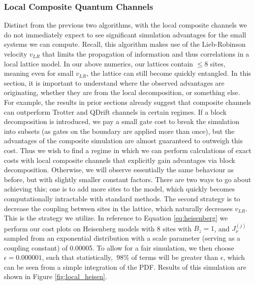 \subsubsection{Local Composite Quantum Channels}
Distinct from the previous two algorithms, with the local composite channels we do not immediately expect to see significant simulation advantages for the small systems we can compute. Recall, this algorithm makes use of the Lieb-Robinson velocity $v_{LR}$ that limits the propagation of information and thus correlations in a local lattice model. In our above numerics, our lattices contain $\leq 8$ sites, meaning even for small $v_{LR}$, the lattice can still become quickly entangled. In this section, it is important to understand where the observed advantages are originating, whether they are from the local decomposition, or something else. For example, the results in prior sections already suggest that composite channels can outperform Trotter and QDrift channels in certain regimes. If a block decomposition is introduced, we pay a small gate cost to break the simulation into subsets (as gates on the boundary are applied more than once), but the advantages of the composite simulation are almost guaranteed to outweigh this cost. Thus we wish to find a regime in which we can perform calculations of exact costs with local composite channels that explicitly gain advantages via block decomposition. Otherwise, we will observe essentially the same behaviour as before, but with slightly smaller constant factors. There are two ways to go about achieving this; one is to add more sites to the model, which quickly becomes computationally intractable with standard methods. The second strategy is to decrease the coupling between sites in the lattice, which naturally decreases $v_{LR}$. This is the strategy we utilize. In reference to Equation \ref{eq:heisenberg} we perform our cost plots on Heisenberg models with 8 sites with $B_z = 1$, and $J_\nu^{(j)}$ sampled from an exponential distribution with a scale parameter (serving as a coupling constant) of 0.00005. To allow for a fair simulation, we then choose $\epsilon = 0.000001$, such that statistically, $~98\% $ of terms will be greater than $\epsilon$, which can be seen from a simple integration of the PDF. Results of this simulation are shown in Figure \ref{fig:local_heisen}.  \\

